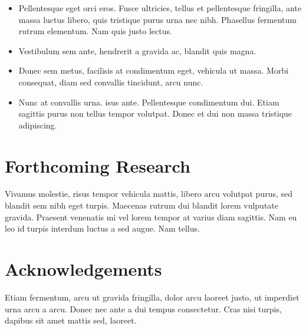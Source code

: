 \documentclass[a0,portrait]{a0poster}
\begin{document}
\begin{multicols}{2}
\begin{itemize}
\item Pellentesque eget orci eros. Fusce ultricies, tellus et pellentesque fringilla, ante massa luctus libero, quis tristique purus urna nec nibh. Phasellus fermentum rutrum elementum. Nam quis justo lectus.
\item Vestibulum sem ante, hendrerit a gravida ac, blandit quis magna.
\item Donec sem metus, facilisis at condimentum eget, vehicula ut massa. Morbi consequat, diam sed convallis tincidunt, arcu nunc.
\item Nunc at convallis urna. isus ante. Pellentesque condimentum dui. Etiam sagittis purus non tellus tempor volutpat. Donec et dui non massa tristique adipiscing.
\end{itemize}

\color{DarkSlateGray} %


\section*{Forthcoming Research}

Vivamus molestie, risus tempor vehicula mattis, libero arcu volutpat purus, sed blandit sem nibh eget turpis. Maecenas rutrum dui blandit lorem vulputate gravida. Praesent venenatis mi vel lorem tempor at varius diam sagittis. Nam eu leo id turpis interdum luctus a sed augue. Nam tellus.


\nocite{*} %


\section*{Acknowledgements}

Etiam fermentum, arcu ut gravida fringilla, dolor arcu laoreet justo, ut imperdiet urna arcu a arcu. Donec nec ante a dui tempus consectetur. Cras nisi turpis, dapibus sit amet mattis sed, laoreet.


\end{multicols}
\end{document}
